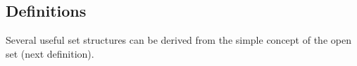 

%

\subsection{Definitions}
Several useful set structures can be derived from the simple concept of the open set
(next definition).


